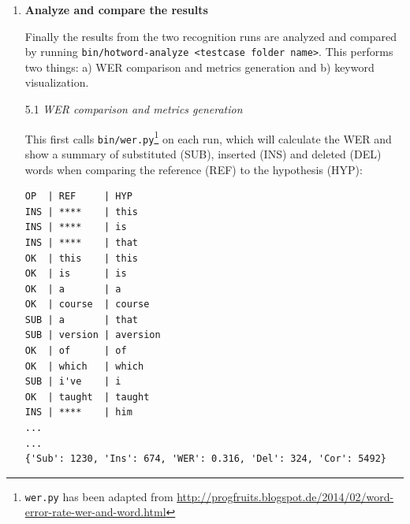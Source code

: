 \documentclass[]{article}
\begin{document}
\begin{enumerate}
  Each testcase folder has a configuration file which specifies which
  models the test run should use:

\begin{verbatim}
  {
    "acousticModelPath": "en-new/cmusphinx-en-us-5.2",
    "dictionaryPath": "en-new/cmudict-en-us.dict",

    "languageModelPath": "en-new/cmusphinx-5.0-en-us.lm",
    "keywordModelPath": "model.lm",
    "g2pModelPath": "en-new/en_us_nostress/model.fst.ser",

    "resultsFolder": "biomed-eng-1"
  }
\end{verbatim}

  \texttt{bin/sphinx-interpolated.py} interprets the ``global'' models
  relative to the repository root-folder \texttt{models}, the
  \texttt{resultsFolder} relative to the root folder \texttt{results}
  and the \texttt{keywordModelPath} relative to the
  \texttt{resultsFolder}. It then supplies the absolute paths to the
  JAR. It also supplies absolute output file paths for the transcription
  result and transcription word timings results.

  This setup ensures reproducible results, as the environment of a given
  testcase is exactly specified (as long as the same binaries and script
  versions are assumed).

  \texttt{bin/sphinx-interpolated.py} can now be used to run the
  baseline or/and interpolated version.
\item
  \textbf{Analyze and compare the results}

  Finally the results from the two recognition runs are analyzed and
  compared by running
  \texttt{bin/hotword-analyze\ \textless{}testcase\ folder\ name\textgreater{}}.
  This performs two things: a) WER comparison and metrics generation and
  b) keyword visualization.

  5.1 \emph{WER comparison and metrics generation}

  This first calls \texttt{bin/wer.py}\footnote{\texttt{wer.py} has been
    adapted from
    \url{http://progfruits.blogspot.de/2014/02/word-error-rate-wer-and-word.html}}
  on each run, which will calculate the WER and show a summary of
  substituted (SUB), inserted (INS) and deleted (DEL) words when
  comparing the reference (REF) to the hypothesis (HYP):

\begin{verbatim}
OP  | REF     | HYP
INS | ****    | this
INS | ****    | is
INS | ****    | that
OK  | this    | this
OK  | is      | is
OK  | a       | a
OK  | course  | course
SUB | a       | that
SUB | version | aversion
OK  | of      | of
OK  | which   | which
SUB | i've    | i
OK  | taught  | taught
INS | ****    | him
...
...
{'Sub': 1230, 'Ins': 674, 'WER': 0.316, 'Del': 324, 'Cor': 5492}
\end{verbatim}


\end{enumerate}
\end{document}
